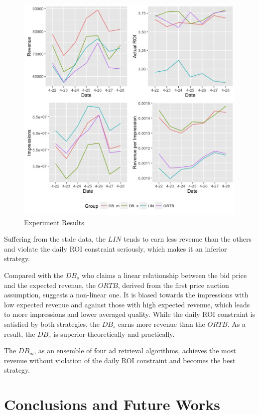 \documentclass{article}
\begin{document}
\begin{figure}[!h]
\centering
\includegraphics[width=1.0\linewidth]{./Result.jpg}
\caption{Experiment Results\label{Result}}
\end{figure}

Suffering from the stale data, the $LIN$ tends to
    earn less revenue than the others and violate the daily ROI constraint seriously,
    which makes it an inferior strategy.

Compared with the $DB_s$ who claims a linear relationship between the bid price and the expected revenue,
    the $ORTB$, derived from the first price auction assumption, suggests a non-linear one.
It is biased towards the impressions with low expected revenue and against those with high expected revenue,
    which leads to more impressions and lower averaged quality.
While the daily ROI constraint is satisfied by both strategies,
    the $DB_s$ earns more revenue than the $ORTB$. As a result, the $DB_s$ is superior theoretically and practically.

The $DB_m$, as an ensemble of four ad retrieval algorithms,
    achieves the most revenue without violation of the daily ROI constraint and becomes the best strategy.

\section{Conclusions and Future Works}
\end{document}
